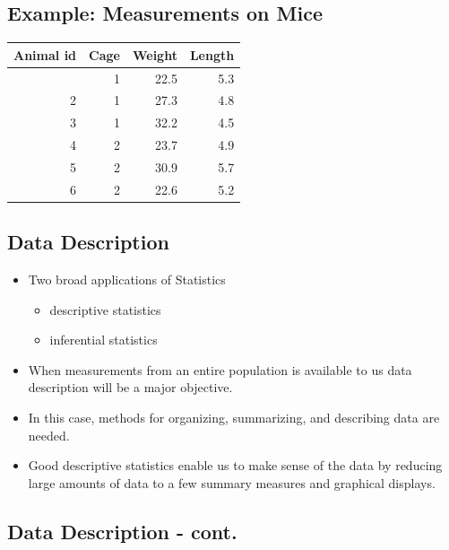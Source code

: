 \documentclass[
  letterpaper,
  DIV=11,
  numbers=noendperiod]{scrartcl}
\newcounter{none} %
\begin{document}
\subsection{Example: Measurements on
Mice}\label{example-measurements-on-mice}

{\def\LTcaptype{none} %
\begin{longtable}[]{@{}rrrr@{}}
\toprule\noalign{}
Animal id & Cage & Weight & Length \\
\midrule\noalign{}
\endhead
\bottomrule\noalign{}
\endlastfoot
1 & 1 & 22.5 & 5.3 \\
2 & 1 & 27.3 & 4.8 \\
3 & 1 & 32.2 & 4.5 \\
4 & 2 & 23.7 & 4.9 \\
5 & 2 & 30.9 & 5.7 \\
6 & 2 & 22.6 & 5.2 \\
\end{longtable}
}

\subsection{Data Description}\label{data-description}

\begin{itemize}
\item
  {Two broad applications of Statistics}\\

  \begin{itemize}
  \item
    descriptive statistics
  \item
    inferential statistics
  \end{itemize}
\item
  When measurements from an entire population is available to us data
  description will be a major objective.
\item
  In this case, methods for organizing, summarizing, and describing data
  are needed.
\item
  Good descriptive statistics enable us to make sense of the data by
  reducing large amounts of data to a few summary measures and graphical
  displays.
\end{itemize}

\subsection{Data Description - cont.}\label{data-description---cont.}
\end{document}
